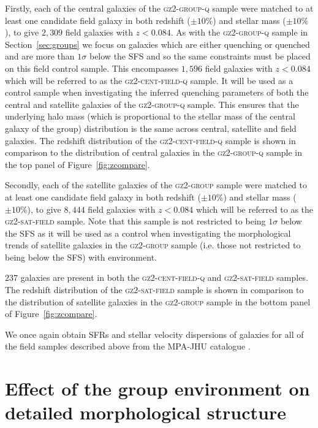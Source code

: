 \documentclass[useAMS,usenatbib]{mn2e}
\def\minor		{\color{minorcol}}
\begin{document}
Firstly, each of the central galaxies of the \textsc{gz2-group-q} sample were matched to at least one candidate field galaxy in both redshift ($\pm10\%$) and stellar mass ($\pm10\%$), to give $2,309$ field galaxies with $z < 0.084$. As with the \textsc{gz2-group-q} sample in Section~\ref{sec:groups} we focus on galaxies which are either quenching or quenched and are more than $1\sigma$ below the SFS and so the same constraints must be placed on this field control sample. This encompasses $1,596$ field galaxies with $z < 0.084$ which will be referred to as the \textsc{gz2-cent-field-q} sample. It will be used as a control sample when investigating the inferred quenching parameters of both the central and satellite galaxies of the \textsc{gz2-group-q} sample. {\minor This ensures that the underlying halo mass (which is proportional to the stellar mass of the central galaxy of the group) distribution is the same across central, satellite and field galaxies}. The redshift distribution of the \textsc{gz2-cent-field-q} sample is shown in comparison to the distribution of central galaxies in the \textsc{gz2-group-q} sample in the top panel of Figure~\ref{fig:zcompare}. 

Secondly, each of the satellite galaxies of the \textsc{gz2-group} sample were matched to at least one candidate field galaxy in both redshift ($\pm10\%$) and stellar mass ($\pm10\%$), to give $8,444$ field galaxies with $z < 0.084$ which will be referred to as the \textsc{gz2-sat-field} sample.  Note that this sample is not restricted to being $1\sigma$ below the SFS as it will be used as a control when investigating the morphological trends of satellite galaxies in the \textsc{gz2-group} sample (i.e. those not restricted to being below the SFS) with environment. 

$237$ galaxies are present in both the \textsc{gz2-cent-field-q} and \textsc{gz2-sat-field} samples. The redshift distribution of the \textsc{gz2-sat-field} sample is shown in comparison to the distribution of satellite galaxies in the \textsc{gz2-group} sample in the bottom panel of Figure~\ref{fig:zcompare}.

We once again obtain SFRs and stellar velocity dispersions of galaxies for all of the field samples described above from the MPA-JHU catalogue \citep{kauffmann03, brinchmann04}.



\section{Effect of the group environment on detailed morphological structure}\label{sec:morphfrac}
\end{document}
